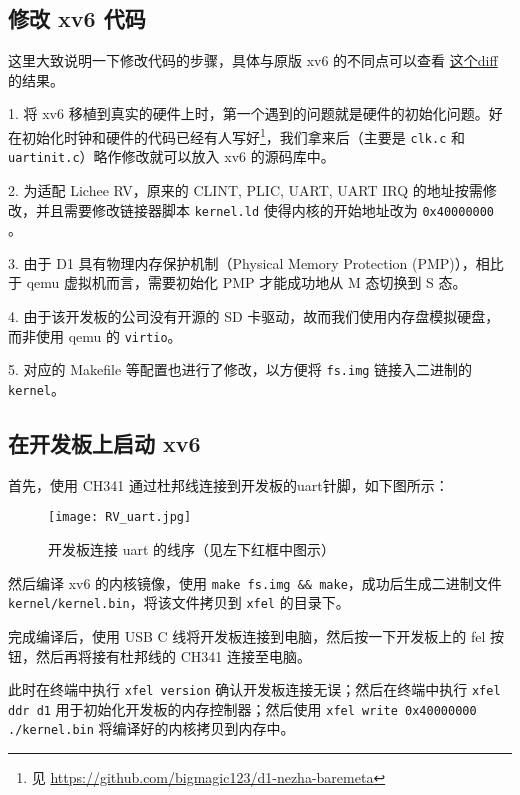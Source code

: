 \subsection{修改 xv6 代码}
这里大致说明一下修改代码的步骤，具体与原版 xv6 的不同点可以查看 \href{https://github.com/jwyjohn/xv6-riscv/commit/54745c4f7eea4af81f8e044953119ad81cd6822b#diff-c53dc675dd68c013f3e29c34d517877d7da3a48af39fe77b7b9541751aed722c}{这个diff} 的结果。

1. 将 xv6 移植到真实的硬件上时，第一个遇到的问题就是硬件的初始化问题。好在初始化时钟和硬件的代码已经有人写好\footnote{见 \url{https://github.com/bigmagic123/d1-nezha-baremeta}}，我们拿来后（主要是 \lstinline{clk.c} 和 \lstinline{uartinit.c}）略作修改就可以放入 xv6 的源码库中。

2. 为适配 Lichee RV，原来的 CLINT, PLIC, UART, UART IRQ 的地址按需修改，并且需要修改链接器脚本 \lstinline{kernel.ld} 使得内核的开始地址改为 \lstinline{0x40000000} 。

3. 由于 D1 具有物理内存保护机制（Physical Memory Protection (PMP)），相比于 qemu 虚拟机而言，需要初始化 PMP 才能成功地从 M 态切换到 S 态。

4. 由于该开发板的公司没有开源的 SD 卡驱动，故而我们使用内存盘模拟硬盘，而非使用 qemu 的 \lstinline{virtio}。

5. 对应的 Makefile 等配置也进行了修改，以方便将 \lstinline{fs.img} 链接入二进制的 \lstinline{kernel}。

\subsection{在开发板上启动 xv6 }

首先，使用 CH341 通过杜邦线连接到开发板的uart针脚，如下图所示：

\begin{figure}[H]
    \centering
    \texttt{[image: RV\_uart.jpg]}
    \caption{ 开发板连接 uart 的线序（见左下红框中图示）}
\end{figure}

然后编译 xv6 的内核镜像，使用 \lstinline{make fs.img && make}，成功后生成二进制文件 \lstinline{kernel/kernel.bin}，将该文件拷贝到 \lstinline{xfel} 的目录下。

完成编译后，使用 USB C 线将开发板连接到电脑，然后按一下开发板上的 fel 按钮，然后再将接有杜邦线的 CH341 连接至电脑。

此时在终端中执行 \lstinline{xfel version} 确认开发板连接无误；然后在终端中执行 \lstinline{xfel ddr d1} 用于初始化开发板的内存控制器；然后使用 \lstinline{xfel write 0x40000000 ./kernel.bin} 将编译好的内核拷贝到内存中。

